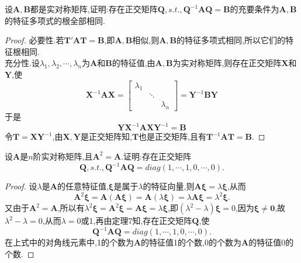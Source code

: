 \documentclass[lang=cn,11pt,normal]{elegantbook}
\begin{document}
	\begin{exercise}
		设$\boldsymbol{A},\boldsymbol{B}$都是实对称矩阵,证明:存在正交矩阵$\boldsymbol{Q},s.t.,\boldsymbol{Q}^{-1}\boldsymbol{AQ}=\boldsymbol{B}$的充要条件为$\boldsymbol{A},\boldsymbol{B}$的特征多项式的根全部相同.
	\end{exercise}
	\begin{proof}
		必要性.若$\boldsymbol{T}'\boldsymbol{AT}=\boldsymbol{B}$,即$\boldsymbol{A},\boldsymbol{B}$相似,则$\boldsymbol{A},\boldsymbol{B}$的特征多项式相同,所以它们的特征根相同.\\
		充分性.设$\lambda_1,\lambda_2,\cdots,\lambda_n$为$\boldsymbol{A}$和$\boldsymbol{B}$的特征值,由$\boldsymbol{A},\boldsymbol{B}$为实对称矩阵,则存在正交矩阵$\boldsymbol{X}$和$\boldsymbol{Y}$,使
		$$
		\boldsymbol{X}^{-1}\boldsymbol{AX}=
		\begin{bmatrix}
		\lambda_1&&\\
		&\ddots&\\
		&&\lambda_n
		\end{bmatrix}
		=\boldsymbol{Y}^{-1}\boldsymbol{BY}
		$$
		于是
		$$
		\boldsymbol{YX}^{-1}\boldsymbol{AXY}^{-1}=\boldsymbol{B}
		$$
		令$\boldsymbol{T}=\boldsymbol{XY}^{-1}$,由$\boldsymbol{X},\boldsymbol{Y}$是正交矩阵知,$\boldsymbol{T}$也是正交矩阵,且有$\boldsymbol{T}^{-1}\boldsymbol{AT}=\boldsymbol{B}$.
	\end{proof}
	\begin{exercise}
		设$\boldsymbol{A}$是$n$阶实对称矩阵,且$\boldsymbol{A}^2=\boldsymbol{A}$.证明:存在正交矩阵
		$$
		\boldsymbol{Q},s.t.,\boldsymbol{Q}^{-1}\boldsymbol{AQ}=diag(1,\cdots,1,0,\cdots,0).
		$$
	\end{exercise}
	\begin{proof}
		设$\lambda$是$\boldsymbol{A}$的任意特征值,$\boldsymbol{\xi}$是属于$\lambda$的特征向量,则$\boldsymbol{A\xi}=\lambda\boldsymbol{\xi}$,从而
		$$
		\boldsymbol{A}^2\boldsymbol{\xi}=\boldsymbol{A}(\boldsymbol{A\xi})=\boldsymbol{A}(\lambda\boldsymbol{\xi})=\lambda\boldsymbol{A\xi}=\lambda^2\boldsymbol{\xi}.
		$$
		又由于$\boldsymbol{A}^2=\boldsymbol{A}$,所以有$\lambda^2\boldsymbol{\xi}=\boldsymbol{A}^2\boldsymbol{\xi}=\boldsymbol{A\xi}=\lambda\boldsymbol{\xi}$,即$(\lambda^2-\lambda)\boldsymbol{\xi}=0$,因为$\boldsymbol{\xi}\ne\boldsymbol{0}$,故$\lambda^2-\lambda=0$,从而$\lambda=0$或1,再由定理7知,存在正交矩阵$\boldsymbol{Q}$,使
		$$
		\boldsymbol{Q}^{-1}\boldsymbol{AQ}=diag(1,\cdots,1,0,\cdots,0).
		$$
		在上式中的对角线元素中,1的个数为$\boldsymbol{A}$的特征值1的个数,0的个数为$\boldsymbol{A}$的特征值0的个数.
	\end{proof}
\end{document}
